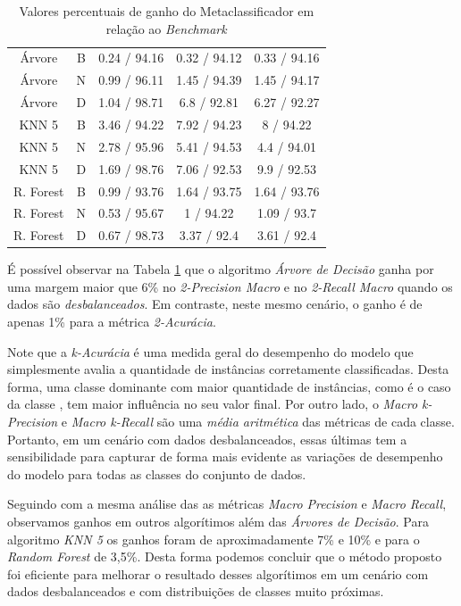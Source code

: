 {\begin{table}[h!]
\begin{center}
{\begin{tabular}{ccccc}
Árvore	&	B	&	0.24 / 94.16	&	0.32 / 94.12	&	0.33 / 94.16	\\
Árvore	&	N	&	0.99 / 96.11	&	1.45 / 94.39	&	1.45 / 94.17	\\
Árvore	&	D	&	1.04 / 98.71	&	6.8 / 92.81	&	6.27 / 92.27	\\
KNN 5	&	B	&	3.46 / 94.22	&	7.92 / 94.23	&	8 / 94.22	\\
KNN 5	&	N	&	2.78 / 95.96	&	5.41 / 94.53	&	4.4 / 94.01	\\
KNN 5	&	D	&	1.69 / 98.76	&	7.06 / 92.53	&	9.9 / 92.53	\\
R. Forest	&	B	&	0.99 / 93.76	&	1.64 / 93.75	&	1.64 / 93.76	\\
R. Forest	&	N	&	0.53 / 95.67	&	1 / 94.22	&	1.09 / 93.7	\\
R. Forest	&	D	&	0.67 / 98.73	&	3.37 / 92.4	&	3.61 / 92.4	\\

      \hline
    \end{tabular}
    }
    \caption{Valores percentuais de ganho do Metaclassificador em relação ao \textit{Benchmark}}
    \label{tab:ganho_meta}
  \end{center}
\end{table}

É possível observar na Tabela \ref{tab:ganho_meta} que o algoritmo \textit{Árvore de Decisão } ganha por uma margem maior que 6\% no \textit{2-Precision Macro} e no \textit{2-Recall Macro} quando os dados são \textit{desbalanceados}.
Em contraste, neste mesmo cenário, o ganho é de apenas 1\% para a métrica \textit{2-Acurácia}.

Note que a \textit{k-Acurácia} é uma medida geral do desempenho do modelo que simplesmente avalia a quantidade de instâncias corretamente classificadas.
Desta forma, uma classe dominante com maior quantidade de instâncias, como é o caso da classe , tem maior influência no seu valor final.
Por outro lado, o \textit{Macro k-Precision} e \textit{Macro k-Recall} são uma \textit{média aritmética} das métricas de cada classe.
Portanto, em um cenário com dados desbalanceados, essas últimas tem a sensibilidade para capturar de forma mais evidente as variações de desempenho do modelo para todas as classes do conjunto de dados.

Seguindo com a mesma análise das as métricas \textit{Macro Precision} e \textit{Macro Recall}, observamos ganhos em outros algorítimos além das \textit{Árvores de Decisão}.
Para algoritmo \textit{KNN 5} os ganhos foram de aproximadamente 7\% e 10\% e para o \textit{Random Forest} de 3,5\%.
Desta forma podemos concluir que o método proposto foi eficiente para melhorar o resultado desses algorítimos em um cenário com dados desbalanceados e com distribuições de classes muito próximas.

}
